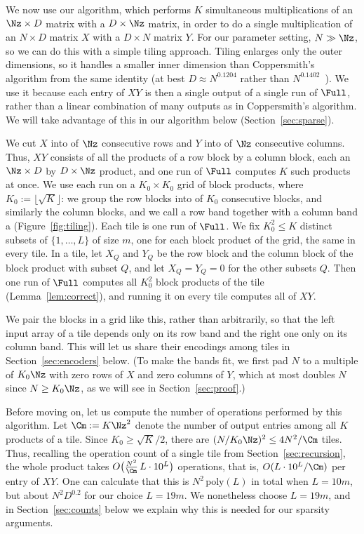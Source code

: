 We now use our algorithm, which performs $K$ simultaneous multiplications of an $\Nz \times D$ matrix with a $D \times \Nz$ matrix, in order to do a single multiplication of an $N \times D$ matrix $X$ with a $D \times N$ matrix $Y$. For our parameter setting, $N \gg \Nz$, so we can do this with a simple tiling approach. Tiling enlarges only the outer dimensions, so it handles a smaller inner dimension than Coppersmith's algorithm from the same identity (at best $D\approx N^{0.1204}$ rather than $N^{0.1402}$~\cite{Cop82}). We use it because each entry of $XY$ is then a single output of a single run of $\Full$, rather than a linear combination of many outputs as in Coppersmith's algorithm. We will take advantage of this in our algorithm below (Section~\ref{sec:sparse}).

We cut $X$ into  of $\Nz$ consecutive rows and $Y$ into  of $\Nz$ consecutive columns. Thus, $XY$ consists of all the products of a row block by a column block, each an $\Nz\times D$ by $D\times\Nz$ product, and one run of $\Full$ computes $K$ such products at once. We use each run on a $K_0\times K_0$ grid of block products, where $K_0:=\lfloor\sqrt K\rfloor$: we group the row blocks into  of $K_0$ consecutive blocks, and similarly the column blocks, and we call a row band together with a column band a  (Figure~\ref{fig:tiling}). Each tile is one run of $\Full$. We fix $K_0^2\le K$ distinct subsets of $\{1,\dots,L\}$ of size $m$, one for each block product of the grid, the same in every tile. In a tile, let $X_Q$ and $Y_Q$ be the row block and the column block of the block product with subset $Q$, and let $X_Q=Y_Q=0$ for the other subsets $Q$. Then one run of $\Full$ computes all $K_0^2$ block products of the tile (Lemma~\ref{lem:correct}), and running it on every tile computes all of $XY$.

We pair the blocks in a grid like this, rather than arbitrarily, so that the left input array of a tile depends only on its row band and the right one only on its column band. This will let us share their encodings among tiles in Section~\ref{sec:encoders} below. (To make the bands fit, we first pad $N$ to a multiple of $K_0\Nz$ with zero rows of $X$ and zero columns of $Y$, which at most doubles $N$ since $N\ge K_0\Nz$, as we will see in Section~\ref{sec:proof}.)

Before moving on, let us compute the number of operations performed by this algorithm. Let $\Cm:=K\Nz^2$ denote the number of output entries among all $K$ products of a tile. 
Since $K_0\ge\sqrt K/2$, there are $(N/K_0\Nz)^2\le4N^2/\Cm$ tiles. Thus, recalling the operation count of a single tile from Section~\ref{sec:recursion}, the whole product takes $O\big(\tfrac{N^2}{\Cm}\,L\cdot10^L\big)$ operations, that is, $O(L\cdot10^L/\Cm)$ per entry of $XY$. One can calculate that this is $N^2\,\mathrm{poly}(L)$ in total when $L=10m$, but about $N^2D^{0.2}$ for our choice $L=19m$. We nonetheless choose $L=19m$, and in Section~\ref{sec:counts} below we explain why this is needed for our sparsity arguments.

